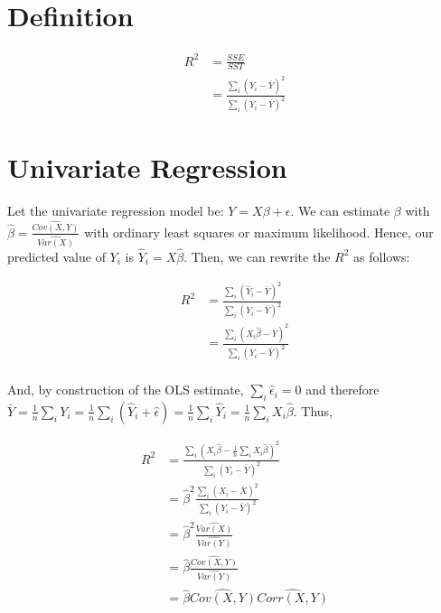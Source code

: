 \documentclass{article}
\begin{document}
	\section*{Definition}
	\begin{align}
		R^2 & = \frac{SSE}{SST} \\ \nonumber
			& = \frac{\sum_i(\hat{Y}_i - \bar{Y})^2}%
					{\sum_i(Y_i - \bar{Y})^2}
	\end{align}

	\section*{Univariate Regression}
	Let the univariate regression model be: $Y=X\beta + \epsilon$. 
	We can estimate $\beta$ with 
	$\hat{\beta} = \frac{\widehat{Cov(X,Y)}}{\widehat{Var(X)}}$
	with ordinary least squares or maximum likelihood. Hence, our
	predicted value of $Y_i$ is $\hat{Y}_i = X\hat{\beta}$. Then, we can
	rewrite the $R^2$ as follows:

	\begin{align}
		R^2 & = \frac{\sum_i(\hat{Y}_i - \bar{Y})^2}%
					{\sum_i(Y_i - \bar{Y})^2} \\ \nonumber
			& = \frac{\sum_i(X_i\hat{\beta} - \bar{Y})^2}%
					{\sum_i(Y_i - \bar{Y})^2} \\ \nonumber
	\end{align}

	And, by construction of the OLS estimate, $\sum_i\hat{\epsilon}_i = 0$
	and therefore
	$\bar{Y} = \frac{1}{n}\sum_iY_i = \frac{1}{n}\sum_i(\hat{Y}_i + \hat{\epsilon})%
	= \frac{1}{n}\sum_i\hat{Y}_i = \frac{1}{n}\sum_iX_i\hat{\beta}$. Thus, 

	\begin{align}
		R^2 & = \frac{\sum_i(X_i\hat{\beta} - \frac{1}{n}\sum_iX_i\hat{\beta})^2}%
					{\sum_i(Y_i - \bar{Y})^2} \\ \nonumber
			& = \hat{\beta}^2\frac{\sum_i(X_i - \bar{X})^2}%
					{\sum_i(Y_i - \bar{Y})^2} \\ \nonumber
			& = \hat{\beta}^2\frac{\widehat{Var(X)}}{\widehat{Var(Y)}} \\ \nonumber
			& = \hat{\beta}\frac{\widehat{Cov(X,Y)}}{\widehat{Var(Y)}} \\ \nonumber
			& = \hat{\beta}\widehat{Cov(X,Y)}\widehat{Corr(X,Y)}
	\end{align}
\end{document}
